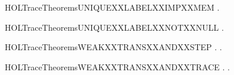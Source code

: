 \newcommand{\HOLTraceTheoremsUNIQUEXXLABELXXDEF}{\UseVerbatim{HOLTraceTheoremsUNIQUEXXLABELXXDEF}}
\begin{SaveVerbatim}{HOLTraceTheoremsUNIQUEXXLABELXXIMPXXMEM}
\HOLTokenTurnstile{} \HOLSymConst{\HOLTokenForall{}} .    \HOLSymConst{\HOLTokenImp{}}   
\end{SaveVerbatim}
\newcommand{\HOLTraceTheoremsUNIQUEXXLABELXXIMPXXMEM}{\UseVerbatim{HOLTraceTheoremsUNIQUEXXLABELXXIMPXXMEM}}
\begin{SaveVerbatim}{HOLTraceTheoremsUNIQUEXXLABELXXNOTXXNULL}
\HOLTokenTurnstile{} \HOLSymConst{\HOLTokenForall{}} .    \HOLSymConst{\HOLTokenImp{}} \HOLSymConst{\HOLTokenNeg{}} 
\end{SaveVerbatim}
\newcommand{\HOLTraceTheoremsUNIQUEXXLABELXXNOTXXNULL}{\UseVerbatim{HOLTraceTheoremsUNIQUEXXLABELXXNOTXXNULL}}
\begin{SaveVerbatim}{HOLTraceTheoremsWEAKXXTRANSXXANDXXSTEP}
\HOLTokenTurnstile{} \HOLSymConst{\HOLTokenForall{}}  .  \HOLTokenWeakTransBegin{}\HOLTokenWeakTransEnd {} \HOLSymConst{\HOLTokenImp{}} \HOLSymConst{\HOLTokenExists{}}.    
\end{SaveVerbatim}
\newcommand{\HOLTraceTheoremsWEAKXXTRANSXXANDXXSTEP}{\UseVerbatim{HOLTraceTheoremsWEAKXXTRANSXXANDXXSTEP}}
\begin{SaveVerbatim}{HOLTraceTheoremsWEAKXXTRANSXXANDXXTRACE}
\HOLTokenTurnstile{} \HOLSymConst{\HOLTokenForall{}}  .
        \HOLTokenWeakTransBegin{}\HOLTokenWeakTransEnd {} \HOLSymConst{\HOLTokenEquiv{}}
       \HOLSymConst{\HOLTokenExists{}}.
               \HOLSymConst{\HOLTokenConj{}} \HOLSymConst{\HOLTokenNeg{}}  \HOLSymConst{\HOLTokenConj{}}   \HOLSymConst{=} \HOLConst{\ensuremath{\tau}}   
              
\end{SaveVerbatim}
